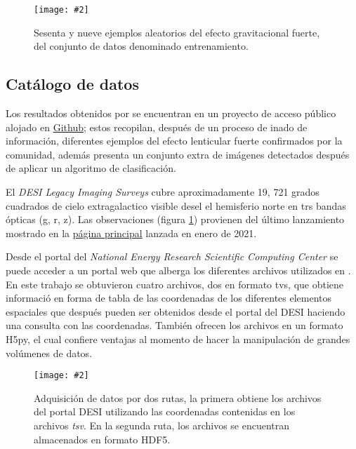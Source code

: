 \documentclass[letterpaper,12pt,oneside]{book}
\newcommand{\figura}[4]{
          \begin{figure}[H]
            \centering
            \texttt{[image: \#2]}
            \caption{#3}
            \label{#4}
          \end{figure}
                            }
\begin{document}
                \figura{0.35}{Imagenes/Resultados/training_lenses}{Sesenta y nueve ejemplos aleatorios del efecto gravitacional fuerte, del conjunto de datos denominado entrenamiento.}{fig:desilegacy}


                \subsection{Catálogo de datos}
                    Los resultados obtenidos por \cite{stein2022mining} se encuentran en un proyecto de acceso público alojado en \href{https://github.com/georgestein/ssl-legacysurvey/tree/main/strong_lensing_paper}{Github}; estos recopilan, después de un proceso de inado de información, diferentes ejemplos del efecto lenticular fuerte confirmados por la comunidad, además presenta un conjunto extra de imágenes detectados después de aplicar un algoritmo de clasificación.

                    El {\it DESI Legacy Imaging Surveys} cubre aproximadamente 19, 721 grados cuadrados de cielo extragalactico visible desel el hemisferio norte en trs bandas ópticas (g, r, z). Las observaciones (figura \ref{fig:desilegacy}) provienen del último lanzamiento mostrado en la \href{https://www.legacysurvey.org/dr9/description/}{página principal} lanzada en enero de 2021.

                    Desde el portal del {\it National Energy Research Scientific Computing Center} se puede acceder a un portal web que alberga los diferentes archivos utilizados en \cite{stein2022mining}. En este trabajo se obtuvieron cuatro archivos, dos en formato tvs, que obtiene informació en forma de tabla de las coordenadas de los diferentes elementos espaciales que después pueden ser obtenidos desde el portal del DESI haciendo una consulta con las coordenadas. También ofrecen los archivos en un formato H5py, el cual confiere ventajas al momento de hacer la manipulación de grandes volúmenes de datos. 

                        \figura{0.55}{Imagenes/Resultados/flujo_datos}{Adquisición de datos por dos rutas, la primera obtiene los archivos del portal DESI utilizando las coordenadas contenidas en los archivos {\it tsv}. En la segunda ruta, los archivos se encuentran almacenados en formato HDF5.}{fig:flujo_datos}
                
\end{document}
